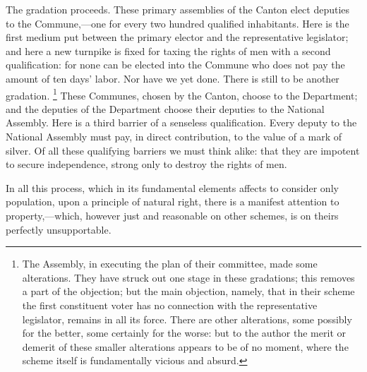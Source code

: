 The gradation proceeds. These primary assemblies of the Canton elect deputies to the Commune,—one for every two hundred qualified inhabitants. Here is the first medium put between the primary elector and the representative legislator; and here a new turnpike is fixed for taxing the rights of men with a second qualification: for none can be elected into the Commune who does not pay the amount of ten days' labor. Nor have we yet done. There is still to be another gradation.
\footnote{ The Assembly, in executing the plan of their committee, made some alterations. They have struck out one stage in these gradations; this removes a part of the objection; but the main objection, namely, that in their scheme the first constituent voter has no connection with the representative legislator, remains in all its force. There are other alterations, some possibly for the better, some certainly for the worse: but to the author the merit or demerit of these smaller alterations appears to be of no moment, where the scheme itself is fundamentally vicious and absurd.}
 These Communes, chosen by the Canton, choose to the Department; and the deputies of the Department choose their deputies to the National Assembly. Here is a third barrier of a senseless qualification. Every deputy to the National Assembly must pay, in direct contribution, to the value of a mark of silver. Of all these qualifying barriers we must think alike: that they are impotent to secure independence, strong only to destroy the rights of men.

In all this process, which in its fundamental elements affects to consider only population, upon a principle of natural right, there is a manifest attention to property,—which, however just and reasonable on other schemes, is on theirs perfectly unsupportable.

